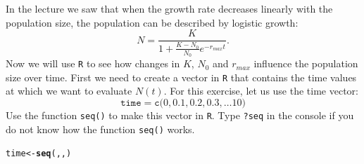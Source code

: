 \documentclass{article}\usepackage[]{graphicx}\usepackage[]{color}
\makeatletter
\newcommand{\hlstd}[1]{\textcolor[rgb]{0.345,0.345,0.345}{#1}}%
\newcommand{\hlkwb}[1]{\textcolor[rgb]{0.69,0.353,0.396}{#1}}%
\newcommand{\hlkwd}[1]{\textcolor[rgb]{0.737,0.353,0.396}{\textbf{#1}}}%
\newenvironment{kframe}{%
 \def\at@end@of@kframe{}%
 \ifinner\ifhmode%
  \def\at@end@of@kframe{\end{minipage}}%
  \begin{minipage}{\columnwidth}%
 \fi\fi%
 \def\FrameCommand##1{\hskip\@totalleftmargin \hskip-\fboxsep
 \colorbox{shadecolor}{##1}\hskip-\fboxsep
     \hskip-\linewidth \hskip-\@totalleftmargin \hskip\columnwidth}%
 \MakeFramed {\advance\hsize-\width
   \@totalleftmargin\z@ \linewidth\hsize
   \@setminipage}}%
 {\par\unskip\endMakeFramed%
 \at@end@of@kframe}
\newenvironment{knitrout}{}{} %
\makeatother
\begin{document}
In the lecture we saw that when the growth rate decreases linearly with the population size, the population can be described by logistic growth:
\begin{equation}
N = \frac{K}{1+\frac{K-N_0}{N_0}e^{-r_{max}t}}.
\label{keq02}
\end{equation}
Now we will use \texttt{R} to see how changes in $K$, $N_0$ and $r_{max}$ influence the population size over time. First we need to create a vector in \texttt{R} that contains the time values at which we want to evaluate $N(t)$. For this exercise, let us use the time vector:
\begin{equation*}
\texttt{time} = \texttt{c(} 0, 0.1, 0.2, 0.3, \dots 10\texttt{)}
\end{equation*}
Use the function \texttt{seq()} to make this vector in \texttt{R}. Type \texttt{?seq} in the console if you do not know how the function \texttt{seq()} works.
\begin{knitrout}
\color{fgcolor}\begin{kframe}
\begin{alltt}
\hlstd{time}\hlkwb{<-}\hlkwd{seq}\hlstd{(    ,   ,   )}
\end{alltt}
\end{kframe}
\end{knitrout}
\end{document}
